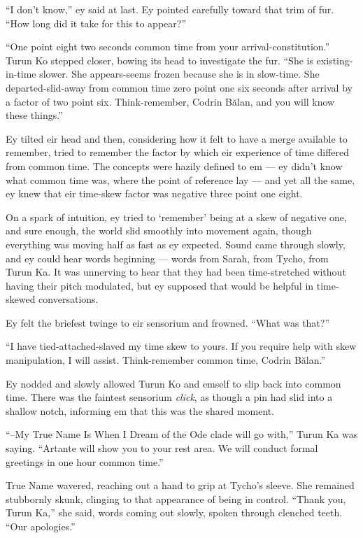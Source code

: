 ``I don't know,'' ey said at last. Ey pointed carefully toward that trim of fur. ``How long did it take for this to appear?''

``One point eight two seconds common time from your arrival-constitution.'' Turun Ko stepped closer, bowing its head to investigate the fur. ``She is existing-in-time slower. She appears-seems frozen because she is in slow-time. She departed-slid-away from common time zero point one six seconds after arrival by a factor of two point six. Think-remember, Codrin Bălan, and you will know these things.''

Ey tilted eir head and then, considering how it felt to have a merge available to remember, tried to remember the factor by which eir experience of time differed from common time. The concepts were hazily defined to em — ey didn't know what common time was, where the point of reference lay — and yet all the same, ey knew that eir time-skew factor was negative three point one eight.

On a spark of intuition, ey tried to `remember' being at a skew of negative one, and sure enough, the world slid smoothly into movement again, though everything was moving half as fast as ey expected. Sound came through slowly, and ey could hear words beginning — words from Sarah, from Tycho, from Turun Ka. It was unnerving to hear that they had been time-stretched without having their pitch modulated, but ey supposed that would be helpful in time-skewed conversations.

Ey felt the briefest twinge to eir sensorium and frowned. ``What was that?''

``I have tied-attached-slaved my time skew to yours. If you require help with skew manipulation, I will assist. Think-remember common time, Codrin Bălan.''

Ey nodded and slowly allowed Turun Ko and emself to slip back into common time. There was the faintest sensorium \emph{click}, as though a pin had slid into a shallow notch, informing em that this was the shared moment.

``--My True Name Is When I Dream of the Ode clade will go with,'' Turun Ka was saying. ``Artante will show you to your rest area. We will conduct formal greetings in one hour common time.''

True Name wavered, reaching out a hand to grip at Tycho's sleeve. She remained stubbornly skunk, clinging to that appearance of being in control. ``Thank you, Turun Ka,'' she said, words coming out slowly, spoken through clenched teeth. ``Our apologies.''

